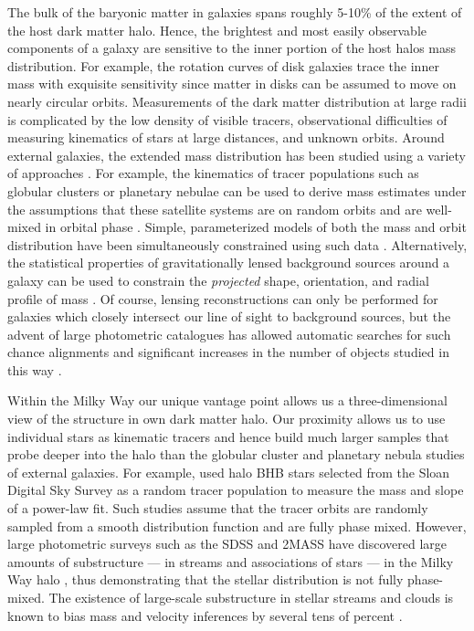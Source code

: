 \documentclass[letterpaper,12pt,preprint]{aastex}
\begin{document}
The bulk of the baryonic matter in galaxies spans roughly 5-10\% of the extent of the host dark matter halo. Hence, the brightest and most easily observable components of a galaxy are sensitive to the inner portion of the host halos mass distribution. For example, the rotation curves of disk galaxies trace the inner mass with exquisite sensitivity since matter in disks can be assumed to move on nearly circular orbits. Measurements of the dark matter distribution at large radii is complicated by the low density of visible tracers, observational difficulties of measuring kinematics of stars at large distances, and unknown orbits. Around external galaxies, the extended mass distribution has been studied using a variety of approaches \citep[see][for a a complete and detailed review]{courteau13}. For example, the kinematics of tracer populations such as globular clusters or planetary nebulae can be used to derive mass estimates under the assumptions that these satellite systems are on random orbits and are well-mixed in orbital phase \citep[early investigations include][]{mendez01,cote03}. Simple, parameterized models of both the mass and orbit distribution have been simultaneously constrained using such data \citep[e.g.][]{napolitano11,deason12c}. Alternatively, the statistical properties of gravitationally lensed background sources around a galaxy can be used to constrain the \emph{projected} shape, orientation, and radial profile of mass \citep[see, for example, the Lens Structure and Dynamics Survey described in][]{koopmans02}. Of course, lensing reconstructions can only be performed for galaxies which closely intersect our line of sight to background sources, but the advent of large photometric catalogues has allowed automatic searches for such chance alignments and significant increases in the number of objects studied in this way \citep[e.g. the Sloan Lens ACS Survey, see][]{bolton06}.

Within the Milky Way our unique vantage point allows us a three-dimensional view of the structure in own dark matter halo. Our proximity allows us to use individual stars as kinematic tracers and hence build much larger samples that probe deeper into the halo than the globular cluster and planetary nebula studies of external galaxies. For example, \cite{deason12a} used halo BHB stars selected from the Sloan Digital Sky Survey \cite[SDSS;][]{york00} as a random tracer population to measure the mass and slope of a power-law fit. Such studies assume that the tracer orbits are randomly sampled from a smooth distribution function and are fully phase mixed. However, large photometric surveys such as the SDSS and 2MASS \citep{TODO} have discovered large amounts of substructure --- in streams and associations of stars --- in the Milky Way halo \citep{TODO many}, thus demonstrating that the stellar distribution is not fully phase-mixed. The existence of large-scale substructure in stellar streams and clouds is known to bias mass and velocity inferences by several tens of percent \citep{yencho06}.
\end{document}
